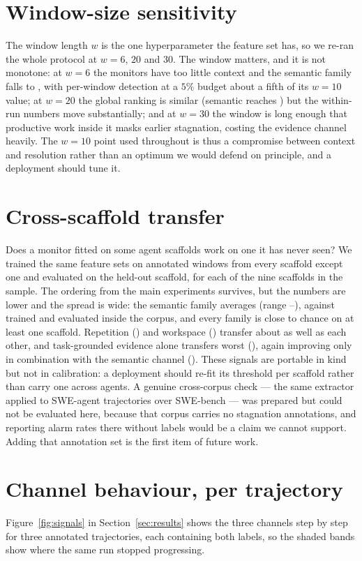 \section{Window-size sensitivity}
\label{app:windows}
The window length $w$ is the one hyperparameter the feature set has, so we re-ran the whole protocol at
$w=6$, $20$ and $30$. The window matters, and it is not monotone: at $w=6$ the monitors have too little
context and the semantic family falls to \pwSixBFoursemantic{}, with per-window detection at a $5\%$
budget about a fifth of its $w=10$ value; at $w=20$ the global ranking is similar (semantic reaches
\pwTwoZeroBFoursemantic{}) but the within-run numbers move substantially; and at $w=30$ the window is long
enough that productive work inside it masks earlier stagnation, costing the evidence channel heavily. The
$w=10$ point used throughout is thus a compromise between context and resolution rather than an optimum we
would defend on principle, and a deployment should tune it.

\section{Cross-scaffold transfer}
\label{app:transfer}
Does a monitor fitted on some agent scaffolds work on one it has never seen? We trained
the same feature sets on annotated windows from every scaffold except one and evaluated on the held-out
scaffold, for each of the nine scaffolds in the sample. The ordering from the main experiments survives,
but the numbers are lower and the spread is wide: the semantic family averages \pcssemanticMean{} (range
\pcssemanticMin{}--\pcssemanticMax{}), against \paucBFoursemantic{} trained and evaluated inside the
corpus, and every family is close to chance on at least one scaffold. Repetition (\pcsrepetitionMean{})
and workspace (\pcsworkspaceMean{}) transfer about as well as each other, and task-grounded evidence alone
transfers worst (\pcsevidenceMean{}), again improving only in combination with the semantic channel
(\pcsevidencesemanticMean{}). These signals are portable in kind but not in calibration: a deployment
should re-fit its threshold per scaffold rather than carry one across agents. A genuine cross-corpus check
--- the same extractor applied to SWE-agent trajectories over SWE-bench --- was prepared but could not be
evaluated here, because that corpus carries no stagnation annotations, and reporting alarm rates there
without labels would be a claim we cannot support. Adding that annotation set is the first item of future
work.

\section{Channel behaviour, per trajectory}
\label{app:signals}
Figure~\ref{fig:signals} in Section~\ref{sec:results} shows the three channels step by step for three
annotated trajectories, each containing both labels, so the shaded bands show where the same run stopped
progressing.
